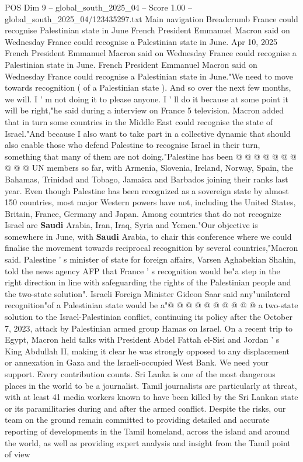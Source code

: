 \begin{textsample}{POS Dim 9 – global\_south\_2025\_04 – Score 1.00 – global\_south\_2025\_04/123435297.txt}  \label{ex:f9_pos_150}
Main navigation Breadcrumb France could recognise Palestinian state in June French President Emmanuel Macron said on Wednesday France could recognise a Palestinian state in June.
Apr 10, 2025 French President Emmanuel Macron said on Wednesday France could recognise a Palestinian state in June.
French President Emmanuel Macron said on Wednesday France could recognise a Palestinian state in June."We need to move towards recognition ( of a Palestinian state ).
And so over the next few months, we will.
I ' m not doing it to please anyone.
I ' ll do it because at some point it will be right,"he said during a interview on France 5 television.
Macron added that in turn some countries in the Middle East could recognise the state of Israel."And because I also want to take part in a collective dynamic that should also enable those who defend Palestine to recognise Israel in their turn, something that many of them are not doing."Palestine has been @ @ @ @ @ @ @ @ @ @ UN members so far, with Armenia, Slovenia, Ireland, Norway, Spain, the Bahamas, Trinidad and Tobago, Jamaica and Barbados joining their ranks last year.
Even though Palestine has been recognized as a sovereign state by almost 150 countries, most major Western powers have not, including the United States, Britain, France, Germany and Japan.
Among countries that do not recognize Israel are \textbf{Saudi} Arabia, Iran, Iraq, Syria and Yemen."Our objective is somewhere in June, with \textbf{Saudi} Arabia, to chair this conference where we could finalise the movement towards reciprocal recognition by several countries,"Macron said.
Palestine ' s minister of state for foreign affairs, Varsen Aghabekian Shahin, told the news agency AFP that France ' s recognition would be"a step in the right direction in line with safeguarding the rights of the Palestinian people and the two-state solution".
Israeli Foreign Minister Gideon Saar said any"unilateral recognition"of a Palestinian state would be a"@ @ @ @ @ @ @ @ @ @ a two-state solution to the Israel-Palestinian conflict, continuing its policy after the October 7, 2023, attack by Palestinian armed group Hamas on Israel.
On a recent trip to Egypt, Macron held talks with President Abdel Fattah el-Sisi and Jordan ' s King Abdullah II, making it clear he was strongly opposed to any displacement or annexation in Gaza and the Israeli-occupied West Bank.
We need your support.
Every contribution counts.
Sri Lanka is one of the most dangerous places in the world to be a journalist.
Tamil journalists are particularly at threat, with at least 41 media workers known to have been killed by the Sri Lankan state or its paramilitaries during and after the armed conflict.
Despite the risks, our team on the ground remain committed to providing detailed and accurate reporting of developments in the Tamil homeland, across the island and around the world, as well as providing expert analysis and insight from the Tamil point of view

\end{textsample}
